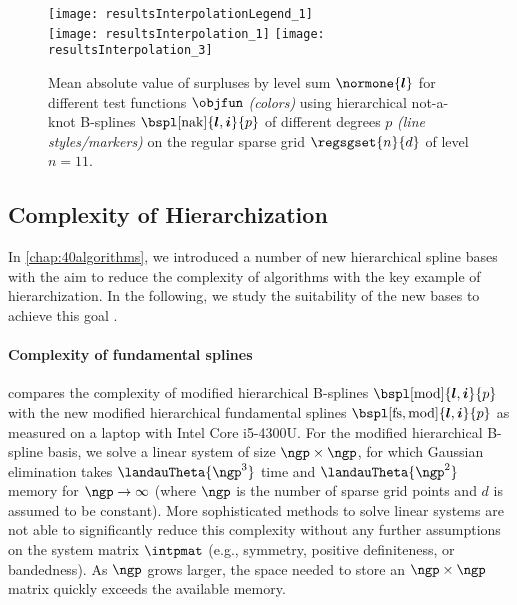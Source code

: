 \begin{figure}
  \texttt{[image: resultsInterpolationLegend\_1]}\\[2mm]%
  \texttt{[image: resultsInterpolation\_1]}%
  \hfill%
  \texttt{[image: resultsInterpolation\_3]}%
  \caption[Decay of surpluses for different test functions]{%
    Mean absolute value of surpluses by level sum $\normone{\*l}$
    for different test functions $\objfun$ \emph{(colors)}
    using hierarchical not-a-knot B-splines
    $\bspl[\nak]{\*l,\*i}{p}$ of different degrees $p$
    \emph{(line styles/markers)} on
    the regular sparse grid $\regsgset{n}{d}$ of level $n = 11$.%
  }%
  \label{fig:resultsDecaySurpluses}%
\end{figure}



\subsection{Complexity of Hierarchization}
\label{sec:543complexity}

In \cref{chap:40algorithms}, we introduced a number of new
hierarchical spline bases with the aim to reduce the complexity
of algorithms with the key example of hierarchization.
In the following, we study the suitability of the new bases
to achieve this goal \cite{Valentin18Fundamental}.

\paragraph{Complexity of fundamental splines}

 compares the complexity of
modified hierarchical B-splines $\bspl[\modified]{\*l,\*i}{p}$ with the new
modified hierarchical fundamental splines $\bspl[\fs,\modified]{\*l,\*i}{p}$
as measured on a laptop with Intel Core i5-4300U.
For the modified hierarchical B-spline basis,
we solve a linear system of size $\ngp \times \ngp$,
for which Gaussian elimination takes
$\landauTheta{\ngp^3}$ time and $\landauTheta{\ngp^2}$ memory for
$\ngp \to \infty$ (where $\ngp$ is the number of sparse grid points and
$d$ is assumed to be constant).
More sophisticated methods to solve linear systems
are not able to significantly
reduce this complexity without any further assumptions on the system matrix
$\intpmat$ (e.g., symmetry, positive definiteness, or bandedness).
As $\ngp$ grows larger,
the space needed to store an $\ngp \times \ngp$ matrix quickly exceeds
the available memory.

